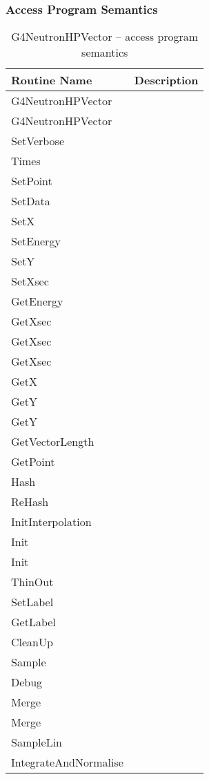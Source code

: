 \documentclass[12pt]{article}
\begin{document}
\subsubsection{Access Program Semantics}%
\begin{longtable}{p{}p{}}
\caption{G4NeutronHPVector -- access program semantics}\label{Table_NeutronHPVectorSemantics}\\
\toprule
\bf Routine Name & \bf Description \\\midrule
\arrayrulecolor{lightgray}
G4NeutronHPVector & \\\hline
G4NeutronHPVector & \\\hline
SetVerbose & \\\hline
Times & \\\hline
SetPoint & \\\hline
SetData & \\\hline
SetX & \\\hline
SetEnergy & \\\hline
SetY & \\\hline
SetXsec & \\\hline
GetEnergy & \\\hline
GetXsec & \\\hline
GetXsec & \\\hline
GetXsec & \\\hline
GetX & \\\hline
GetY & \\\hline
GetY & \\\hline
GetVectorLength & \\\hline
GetPoint & \\\hline
Hash & \\\hline
ReHash & \\\hline
InitInterpolation & \\\hline
Init & \\\hline
Init & \\\hline
ThinOut & \\\hline
SetLabel & \\\hline
GetLabel & \\\hline
CleanUp & \\\hline
Sample & \\\hline
Debug & \\\hline
Merge & \\\hline
Merge & \\\hline
SampleLin & \\\hline
IntegrateAndNormalise & \\\hline

\end{longtable}
\end{document}
